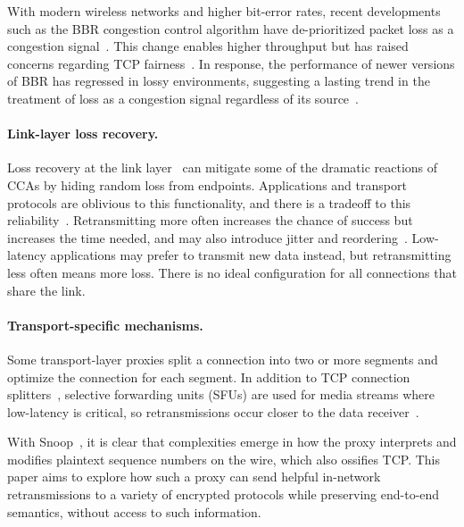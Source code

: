 With modern wireless networks and higher bit-error rates, recent developments
such as the BBR congestion control
algorithm have de-prioritized packet loss as a congestion
signal~\cite{cardwell2017bbr}. This change enables higher throughput but has
raised concerns regarding TCP fairness~\cite
{ware2019modeling,philip2024prudentia}. In response, the performance of newer
versions of BBR has regressed in lossy environments, suggesting a lasting trend
in the treatment of loss as a congestion signal regardless of its source~\cite
{yuan2025internet}.

\paragraph{Link-layer loss recovery.}

Loss recovery at the link layer~\cite{3gpp5gstandard,le2022link,ieee80211e} can
mitigate some of the dramatic reactions of CCAs by hiding random loss from
endpoints.
Applications and transport protocols are oblivious to this
functionality, and there is a tradeoff to this reliability~\cite{klingler2018impact,kliazovich2012arqproxy}.
Retransmitting more often increases the chance
of success but increases the time needed, and may also introduce
jitter and reordering~\cite{leung2007overview}.
Low-latency applications may prefer to transmit new data instead, but
retransmitting less often means more loss.
There is no ideal configuration for all connections that share the link.

\paragraph{Transport-specific mechanisms.}

Some transport-layer proxies split a connection into two or more segments
and optimize the connection for each segment. In addition to
TCP connection splitters~\cite{rfc3135,honda2011still,hayes2019mmwave},
selective forwarding units (SFUs) are
used for media streams where low-latency is critical, so retransmissions occur
closer to the data receiver~\cite{rfc7667,andre2018comparative}.

With Snoop~\cite{balakrishnan1995snoop}, it is clear
that complexities emerge in how the proxy interprets
and modifies plaintext sequence numbers on the wire, which also ossifies TCP.
This paper aims to explore how such a proxy can send helpful in-network
retransmissions to a variety of encrypted protocols while preserving
end-to-end semantics, without access to such information.

